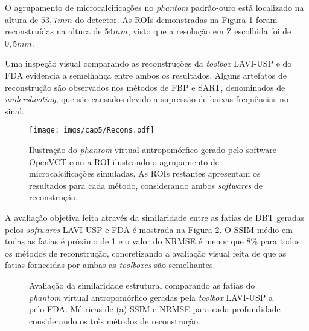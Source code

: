  O agrupamento de microcalcificações no \textit{phantom} padrão-ouro está localizado na altura de  $53,7mm$ do detector. As \acs{ROI}s demonstradas na Figura \ref{fig:imgCap6VCT} foram reconstruídas na altura de $54mm$, visto que a resolução em Z escolhida foi de $0,5mm$. 
 
 Uma inspeção visual comparando as reconstruções da \textit{toolbox} LAVI-USP e do \acs{FDA} evidencia a semelhança entre ambos os resultados. Alguns artefatos de reconstrução são observados nos métodos de \acs{FBP} e \acs{SART}, denominados de \textit{undershooting}, que são causados devido a supressão de baixas frequências no sinal.
 
 \begin{figure}[!ht]
 	\caption{Ilustração do \textit{phantom} virtual antropomórfico gerado pelo software OpenVCT com a \acs{ROI} ilustrando o agrupamento de microcalcificações simuladas. As \acs{ROI}s restantes apresentam os resultados para cada método, considerando ambos \textit{softwares} de reconstrução.}
 	\begin{center}
 		\texttt{[image: imgs/cap5/Recons.pdf]}
 	\end{center}
 	\label{fig:imgCap6VCT}
 \end{figure} 

A avaliação objetiva feita através da similaridade entre as fatias de \acs{DBT} geradas pelos \textit{softwares} LAVI-USP e \acs{FDA} é mostrada na Figura \ref{fig:imgCap6VCTSSIMMSE}. O \acs{SSIM} médio em todas as fatias é próximo de 1 e o valor do \acs{NRMSE} é menor que 8\% para todos os métodos de reconstrução, concretizando a avaliação visual feita de que as fatias fornecidas por ambas as \textit{toolboxes} são semelhantes.

\begin{figure}[!ht]
	\centering	
	\caption{ Avaliação da similaridade estrutural comparando as fatias do \textit{phantom} virtual antropomórfico geradas pela \textit{toolbox} LAVI-USP a pelo \acs{FDA}. Métricas de (a) \acs{SSIM} e \acs{NRMSE} para cada profundidade considerando os três métodos de reconstrução.}
	\hfill
	\label{fig:imgCap6VCTSSIMMSE}
\end{figure}


